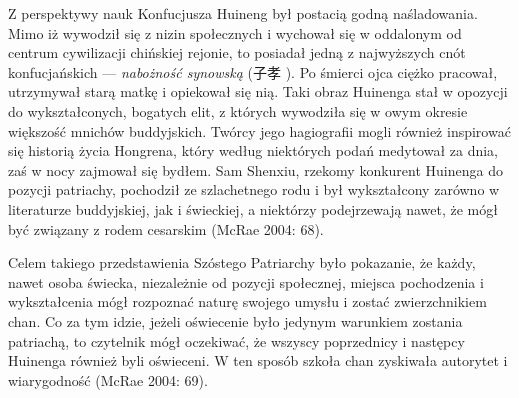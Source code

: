 Z perspektywy nauk Konfucjusza Huineng był postacią godną naśladowania.
Mimo iż wywodził się z nizin społecznych i wychował się w oddalonym od centrum cywilizacji chińskiej rejonie, to posiadał jedną z najwyższych cnót konfucjańskich --- \textit{nabożność synowską} (子孝 ).
Po śmierci ojca ciężko pracował, utrzymywał starą matkę i opiekował się nią.
Taki obraz Huinenga stał w opozycji do wykształconych, bogatych elit, z których wywodziła się w owym okresie większość mnichów buddyjskich.
Twórcy jego hagiografii mogli również inspirować się historią życia Hongrena, który według niektórych podań medytował za dnia, zaś w nocy zajmował się bydłem.
Sam Shenxiu, rzekomy konkurent Huinenga do pozycji patriachy, pochodził ze szlachetnego rodu i był wykształcony zarówno w literaturze buddyjskiej, jak i świeckiej, a niektórzy podejrzewają nawet, że mógł być związany z rodem cesarskim
(McRae 2004: 68).

Celem takiego przedstawienia Szóstego Patriarchy było pokazanie, że każdy, nawet osoba świecka, niezależnie od pozycji społecznej, miejsca pochodzenia i wykształcenia mógł rozpoznać naturę swojego umysłu i zostać zwierzchnikiem chan.
Co za tym idzie, jeżeli oświecenie było jedynym warunkiem zostania patriachą, to czytelnik mógł oczekiwać, że wszyscy poprzednicy i następcy Huinenga również byli oświeceni.
W ten sposób szkoła chan zyskiwała autorytet i wiarygodność
(McRae 2004: 69).
